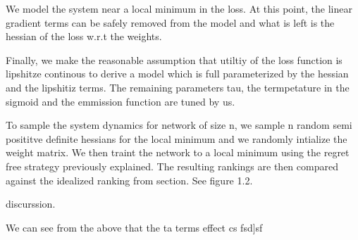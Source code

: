 \documentclass{article}
\begin{document}
We model the system near a local minimum in the loss. At this point, the linear gradient terms can be safely removed from the model and what is left is the hessian of the loss w.r.t the weights. 

Finally, we make the reasonable assumption that utiltiy of the loss function is lipshitze continous to derive a model which is full parameterized by the hessian and the lipshitiz terms. The remaining parameters tau, the termpetature in the sigmoid and the emmission function are tuned by us. 

To sample the system dynamics for network of size n, we sample n random semi posititve definite hessians for the local minimum and we randomly intialize the weight matrix. We then traint the network to a local minimum using the regret free strategy previously explained. The resulting rankings are then compared against the idealized ranking from section. See figure 1.2.

discurssion. 


We can see from the above that the ta terms effect cs fsd]sf
\end{document}
